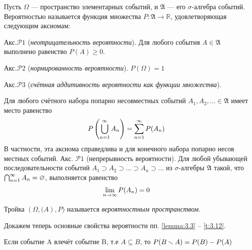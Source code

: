 
\begin{definition}
	Пусть $\Omega$ — пространство элементарных событий, и
$\mathfrak{A}$ — его $\sigma$-алгебра событий. Вероятностью называется функция множества
$P: \mathfrak{A}\rightarrow \mathbb{R}$, удовлетворяющая следующим аксиомам:

Акс.$\mathcal{P}1$ (\textit{неотрицательность вероятности}). Для любого события $A\in\mathfrak{A}$ выполнено равенство $P(A)\geqslant 0$.

Акс.$\mathcal{P}2$ (\textit{нормированность вероятности}). $P(\Omega)=1$ 

Акс.$\mathcal{P}3$ (\textit{счётная аддитивность вероятности как функции множества}).
\end{definition}
Для любого счётного набора попарно несовместных событий \newline $A_1,A_2,\dots\in 
\mathfrak{A}$
имеет место равенство
\begin{equation}
	P\left(\bigcup_{n=1}^{\infty}A_n \right)=\sum^{\infty}_{n=1}P(A_n) \notag
\end{equation}
В частности, эта аксиома справедлива и для конечного набора попарно несов
местных событий.
Акс. $\mathcal{P}1$ (непрерывность вероятности). Для любой убывающей последовательности событий $A_1 \supset A_2 \supset\dots\supset A_n \supset \dots$ из $\sigma$-алгебры $\mathfrak{A}$ такой, что $\bigcap_{n=1}^{\infty}A_n=\varnothing$,
выполняется равенство
\begin{equation}
	\lim\limits_{n\to\infty}P(A_n)=0 \notag
\end{equation}
\begin{definition}
	Тройка $(\Omega,\mathfrak(A),P)$ называется \textit{вероятностным пространством}.
\end{definition}
Докажем теперь основные свойства вероятности пп. \ref{lemma:3.3} – \ref{t:3.12}.
\begin{lemma}
	\label{lemma:3.3}
	Если событие A влечёт событие B, т.е $A\subseteq B$, то $P(B\smallsetminus A)=P(B)-P(A)$
\end{lemma}

